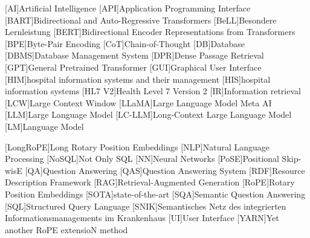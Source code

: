 \begin{acronym}[SPARQL]
[AI]{Artificial Intelligence}
[API]{Application Programming Interface}
[BART]{Bidirectional and Auto-Regressive Transformers}
[BeLL]{Besondere Lernleistung}
[BERT]{Bidirectional Encoder Representations from Transformers}
[BPE]{Byte-Pair Encoding}
[CoT]{Chain-of-Thought}
[DB]{Database}
[DBMS]{Database Management System}
[DPR]{Dense Passage Retrieval}
[GPT]{General Pretrained Transformer}
[GUI]{Graphical User Interface}
[HIM]{hospital information systems and their management}
[HIS]{hospital information systems}
[HL7 V2]{Health Level 7 Version 2}
[IR]{Information retrieval}
[LCW]{Large Context Window}
[LLaMA]{Large Language Model Meta AI}
[LLM]{Large Language Model}
[LC-LLM]{Long-Context Large Language Model}
[LM]{Language Model}

[LongRoPE]{Long Rotary Position Embeddings}
[NLP]{Natural Language Processing}
[NoSQL]{Not Only SQL}
[NN]{Neural Networks}
[PoSE]{Positional Skip-wisE}
[QA]{Question Answering}
[QAS]{Question Answering System}
[RDF]{Resource Description Framework}
[RAG]{Retrieval-Augmented Generation}
[RoPE]{Rotary Position Embeddings}
[SOTA]{state-of-the-art}
[SQA]{Semantic Question Answering}
[SQL]{Structured Query Language}
[SNIK]{Semantisches Netz des integrierten Informationsmanagements im Krankenhaus}
[UI]{User Interface}
[YARN]{Yet another RoPE extensioN method}
\end{acronym}
